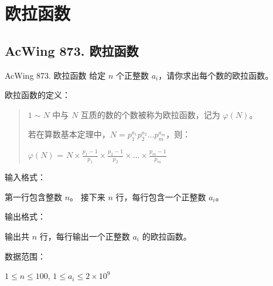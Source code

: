\section{欧拉函数}

\subsection{AcWing 873. 欧拉函数}
\begin{titledbox}{AcWing 873. 欧拉函数}
    给定 $n$ 个正整数 $a_i$，请你求出每个数的欧拉函数。

    欧拉函数的定义：

    \begin{quote}
        $1 \sim N$ 中与 $N$ 互质的数的个数被称为欧拉函数，记为 $\varphi(N)$。

        若在算数基本定理中，$N = p_1^{a_1}p_2^{a_2}\dots p_m^{a_m}$，则：

        $\varphi (N)$ = $N \times \frac{p_1-1}{p_1} \times \frac{p_2-1}{p_2} \times \dots \times \frac{p_m-1}{p_m}$
    \end{quote}

    输入格式：

    第一行包含整数 $n$。 接下来 $n$ 行，每行包含一个正整数 $a_i$。

    输出格式：

    输出共 $n$ 行，每行输出一个正整数 $a_i$ 的欧拉函数。

    数据范围：

    $1 \le n \le 100$, $1 \le a_i \le 2 \times 10^9$

    \begin{inputblock}
         \\
         \\
         \\
    \end{inputblock}
    \begin{outputblock}
         \\
         \\
    \end{outputblock}
\end{titledbox}

